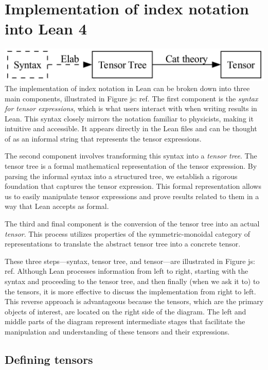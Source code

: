 \documentclass[a4paper, 11pt]{article}
\newcommand{\js}[1]{ {\color{magenta} js:  #1}}
\begin{document}
\section{Implementation of index notation into Lean 4}
\includegraphics[width=\textwidth]{overviewFlow.png}
The implementation of index notation in Lean can be  broken down into 
three main components, illustrated in Figure \js{ref}. 
The first component is the \emph{syntax for tensor expressions}, 
which is what users interact with when writing results in Lean. 
This syntax closely mirrors the notation familiar to physicists, 
making it intuitive and accessible. 
It appears directly in the Lean files and can be thought of as an informal string 
that represents the tensor expressions.

The second component involves transforming this syntax into a \emph{tensor tree}. 
The tensor tree is a formal mathematical representation of the tensor expression. 
By parsing the informal syntax into a structured tree, 
we establish a rigorous foundation that captures the tensor expression. 
This formal representation allows us to easily manipulate tensor expressions and
prove results related to them in a way that Lean accepts as formal.

The third and final component is the conversion of the tensor tree into an actual \emph{tensor}. 
This process utilizes properties of the symmetric-monoidal category of representations
 to translate the abstract tensor tree into a concrete tensor.

These three steps—syntax, tensor tree, and tensor—are illustrated in Figure \js{ref}. 
Although Lean processes information from left to right, 
starting with the syntax and proceeding to the tensor tree, and then finally (when 
we ask it to) to the tensors, 
it is more effective to discuss the implementation from right to left. 
This reverse approach is advantageous because the tensors,
 which are the primary objects of interest, are located on the right side of the diagram. 
 The left and middle parts of the diagram represent intermediate stages that facilitate the 
 manipulation and understanding of these tensors and their expressions.

 \subsection{Defining tensors}
\end{document}
